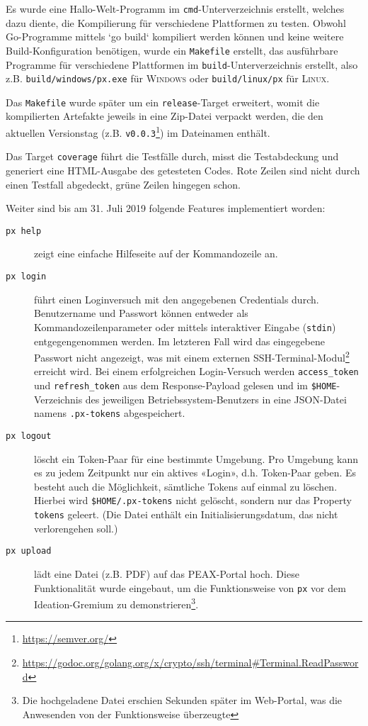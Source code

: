 Es wurde eine Hallo-Welt-Programm im \texttt{cmd}-Unterverzeichnis \cite[p. 293]{gopl} erstellt, welches dazu diente, die Kompilierung für verschiedene Plattformen zu testen. Obwohl Go-Programme mittels `go build` kompiliert werden können und keine weitere Build-Konfiguration benötigen, wurde ein \texttt{Makefile} erstellt, das ausführbare Programme für verschiedene Plattformen im \texttt{build}-Unterverzeichnis erstellt, also z.B. \texttt{build/windows/px.exe} für \textsc{Windows} oder \texttt{build/linux/px} für \textsc{Linux}.

Das \texttt{Makefile} wurde später um ein \texttt{release}-Target erweitert, womit die kompilierten Artefakte jeweils in eine Zip-Datei verpackt werden, die den aktuellen Versionstag (z.B. \texttt{v0.0.3}\footnote{\url{https://semver.org/}}) im Dateinamen enthält.

Das Target \texttt{coverage} führt die Testfälle durch, misst die Testabdeckung und generiert eine HTML-Ausgabe des getesteten Codes. Rote Zeilen sind nicht durch einen Testfall abgedeckt, grüne Zeilen hingegen schon. \cite[Kapitel 11.3]{gopl}

Weiter sind bis am 31. Juli 2019 folgende Features implementiert worden:

\begin{description}
	\item[\texttt{px help}] zeigt eine einfache Hilfeseite auf der Kommandozeile an.
    \item[\texttt{px login}] führt einen Loginversuch mit den angegebenen Credentials durch. Benutzername und Passwort können entweder als Kommandozeilenparameter oder mittels interaktiver Eingabe (\texttt{stdin}) entgegengenommen werden. Im letzteren Fall wird das eingegebene Passwort nicht angezeigt, was mit einem externen SSH-Ter\-mi\-nal-Modul\footnote{\url{https://godoc.org/golang.org/x/crypto/ssh/terminal\#Terminal.ReadPassword}} erreicht wird. Bei einem erfolgreichen Login-Versuch werden \texttt{access\_token} und \texttt{refresh\_token} aus dem Response-Payload gelesen und im \texttt{\$HOME}-Verzeichnis des jeweiligen Betriebssystem-Benutzers in eine JSON-Datei namens \texttt{.px-tokens} abgespeichert.
	\item[\texttt{px logout}] löscht ein Token-Paar für eine bestimmte Umgebung. Pro Umgebung kann es zu jedem Zeitpunkt nur ein aktives «Login», d.h. Token-Paar geben. Es besteht auch die Möglichkeit, sämtliche Tokens auf einmal zu löschen. Hierbei wird \texttt{\$HOME/.px-tokens} nicht gelöscht, sondern nur das Property \texttt{tokens} geleert. (Die Datei enthält ein Initialisierungsdatum, das nicht verlorengehen soll.)
	\item[\texttt{px upload}] lädt eine Datei (z.B. PDF) auf das PEAX-Portal hoch. Diese Funktionalität wurde eingebaut, um die Funktionsweise von \texttt{px} vor dem Ideation-Gremium zu demonstrieren\footnote{Die hochgeladene Datei erschien Sekunden später im Web-Portal, was die Anwesenden von der Funktionsweise überzeugte}.
\end{description}

